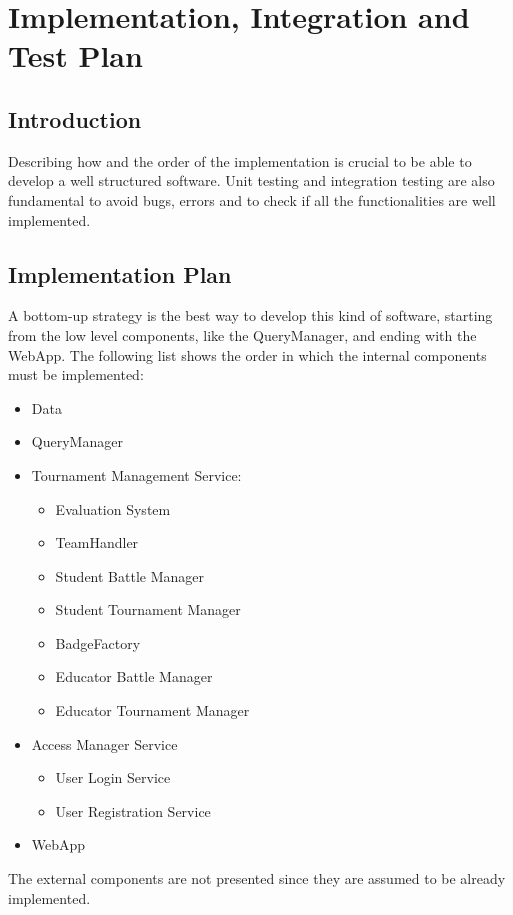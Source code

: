 \documentclass[a4paper, 11pt, titlepage]{article}
\begin{document}
\section{Implementation, Integration and Test Plan}

\subsection{Introduction}
Describing how and the order of the implementation is crucial to be able to develop a well
structured software.
Unit testing and integration testing are also fundamental to avoid bugs, errors and to check if
all the functionalities are well implemented.

\subsection{Implementation Plan}
A bottom-up strategy is the best way to develop this kind of software, starting from the low
level components, like the QueryManager, and ending with the WebApp.
The following list shows the order in which the
internal components must be implemented:

\begin{itemize}
  \item Data
  \item QueryManager
  \item Tournament Management Service:
  \begin{itemize}
      \item Evaluation System
      \item TeamHandler
      \item Student Battle Manager
      \item Student Tournament Manager
      \item BadgeFactory
      \item Educator Battle Manager
      \item Educator Tournament Manager
  \end{itemize}
  \item Access Manager Service
  \begin{itemize}
      \item User Login Service
      \item User Registration Service
  \end{itemize}
  \item WebApp
\end{itemize}

The external components are not presented since they are assumed to be already implemented.
\end{document}
